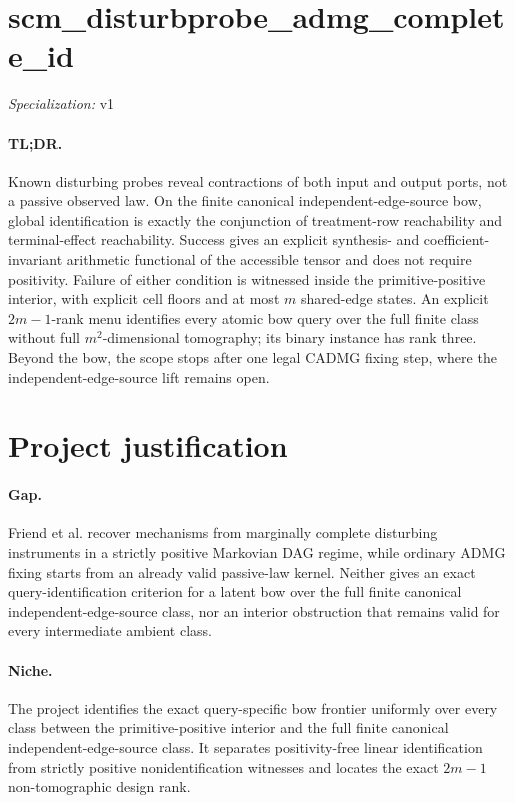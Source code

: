 \documentclass{article}
\begin{document}
\sloppy

\section*{scm\_\allowbreak{}disturbprobe\_\allowbreak{}admg\_\allowbreak{}complete\_\allowbreak{}id}

\noindent\textit{Specialization:} v1\par

\paragraph{TL;DR.} Known disturbing probes reveal contractions of both input and output ports, not a passive observed law. On the finite canonical independent-edge-source bow, global identification is exactly the conjunction of treatment-row reachability and terminal-effect reachability. Success gives an explicit synthesis- and coefficient-invariant arithmetic functional of the accessible tensor and does not require positivity. Failure of either condition is witnessed inside the primitive-positive interior, with explicit cell floors and at most \(m\) shared-edge states. An explicit \(2m-1\)-rank menu identifies every atomic bow query over the full finite class without full \(m^2\)-dimensional tomography; its binary instance has rank three. Beyond the bow, the scope stops after one legal CADMG fixing step, where the independent-edge-source lift remains open.

\section{Project justification}

\paragraph{Gap.} Friend et al. recover mechanisms from marginally complete disturbing instruments in a strictly positive Markovian DAG regime, while ordinary ADMG fixing starts from an already valid passive-law kernel. Neither gives an exact query-identification criterion for a latent bow over the full finite canonical independent-edge-source class, nor an interior obstruction that remains valid for every intermediate ambient class.

\paragraph{Niche.} The project identifies the exact query-specific bow frontier uniformly over every class between the primitive-positive interior and the full finite canonical independent-edge-source class. It separates positivity-free linear identification from strictly positive nonidentification witnesses and locates the exact \(2m-1\) non-tomographic design rank.
\end{document}
